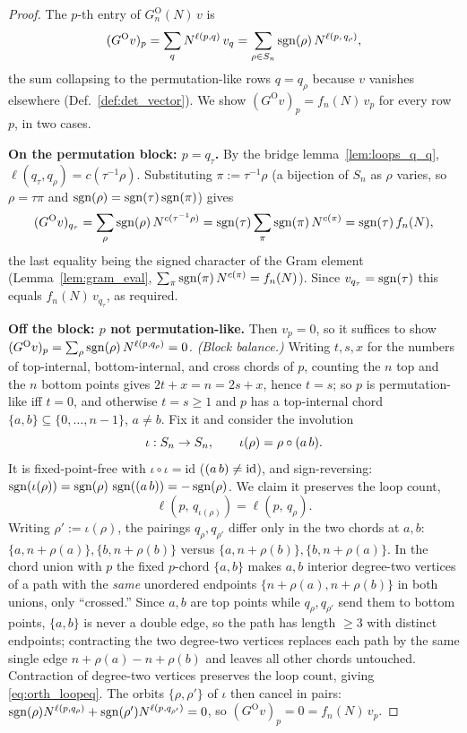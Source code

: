 \begin{proof}\leanok
{}
The $p$-th entry of $G^{\mathrm O}_n(N)\,v$ is
\[
  (G^{\mathrm O}v)_p=\sum_{q}N^{\ell(p,q)}\,v_q
  =\sum_{\rho\in S_n}\operatorname{sgn}(\rho)\,N^{\ell(p,\,q_\rho)},
\]
the sum collapsing to the permutation-like rows $q=q_\rho$ because $v$
vanishes elsewhere (Def.~\ref{def:det_vector}). We show
$(G^{\mathrm O}v)_p=f_n(N)\,v_p$ for every row $p$, in two cases.

\medskip
\noindent\textbf{On the permutation block: $p=q_\tau$.}
By the bridge lemma~\ref{lem:loops_q_q}, $\ell(q_\tau,q_\rho)=c(\tau^{-1}\rho)$.
Substituting $\pi:=\tau^{-1}\rho$ (a bijection of $S_n$ as $\rho$ varies, so
$\rho=\tau\pi$ and $\operatorname{sgn}(\rho)=\operatorname{sgn}(\tau)\operatorname{sgn}(\pi)$) gives
\[
  (G^{\mathrm O}v)_{q_\tau}
  =\sum_{\rho}\operatorname{sgn}(\rho)\,N^{c(\tau^{-1}\rho)}
  =\operatorname{sgn}(\tau)\sum_{\pi}\operatorname{sgn}(\pi)\,N^{c(\pi)}
  =\operatorname{sgn}(\tau)\,f_n(N),
\]
the last equality being the signed character of the Gram element
(Lemma~\ref{lem:gram_eval}, $\sum_{\pi}\operatorname{sgn}(\pi)\,N^{c(\pi)}=f_n(N)$). Since
$v_{q_\tau}=\operatorname{sgn}(\tau)$ this equals $f_n(N)\,v_{q_\tau}$, as required.

\medskip
\noindent\textbf{Off the block: $p$ not permutation-like.}
Then $v_p=0$, so it suffices to show
$(G^{\mathrm O}v)_p=\sum_\rho\operatorname{sgn}(\rho)\,N^{\ell(p,q_\rho)}=0$.
\emph{(Block balance.)} Writing $t,s,x$ for the numbers of top-internal,
bottom-internal, and cross chords of $p$, counting the $n$ top and the $n$
bottom points gives $2t+x=n=2s+x$, hence $t=s$; so $p$ is permutation-like
iff $t=0$, and otherwise $t=s\ge1$ and $p$ has a top-internal chord
$\{a,b\}\subseteq\{0,\dots,n-1\}$, $a\neq b$. Fix it and consider the involution
\[
  \iota:S_n\to S_n,\qquad \iota(\rho)=\rho\circ(a\,b).
\]
It is fixed-point-free with $\iota\circ\iota=\mathrm{id}$ ($(a\,b)\ne\mathrm{id}$),
and sign-reversing: $\operatorname{sgn}(\iota(\rho))=\operatorname{sgn}(\rho)\,\operatorname{sgn}((a\,b))=-\operatorname{sgn}(\rho)$.
We claim it preserves the loop count,
\begin{equation}\label{eq:orth_loopeq}
  \ell(p,\,q_{\iota(\rho)})=\ell(p,\,q_\rho).
\end{equation}
Writing $\rho':=\iota(\rho)$, the pairings $q_\rho,q_{\rho'}$ differ only in the two
chords at $a,b$: $\{a,n+\rho(a)\},\{b,n+\rho(b)\}$ versus
$\{a,n+\rho(b)\},\{b,n+\rho(a)\}$. In the chord union with $p$ the fixed
$p$-chord $\{a,b\}$ makes $a,b$ interior degree-two vertices of a path with the
\emph{same} unordered endpoints $\{n+\rho(a),n+\rho(b)\}$ in both unions, only
``crossed.'' Since $a,b$ are top points while $q_\rho,q_{\rho'}$ send them to
bottom points, $\{a,b\}$ is never a double edge, so the path has length
$\ge3$ with distinct endpoints; contracting the two degree-two vertices
replaces each path by the same single edge $n+\rho(a)\!-\!n+\rho(b)$ and leaves
all other chords untouched. Contraction of degree-two vertices preserves the
loop count, giving \eqref{eq:orth_loopeq}. The orbits $\{\rho,\rho'\}$ of
$\iota$ then cancel in pairs:
$\operatorname{sgn}(\rho)N^{\ell(p,q_\rho)}+\operatorname{sgn}(\rho')N^{\ell(p,q_{\rho'})}=0$, so
$(G^{\mathrm O}v)_p=0=f_n(N)\,v_p$.


\end{proof}
